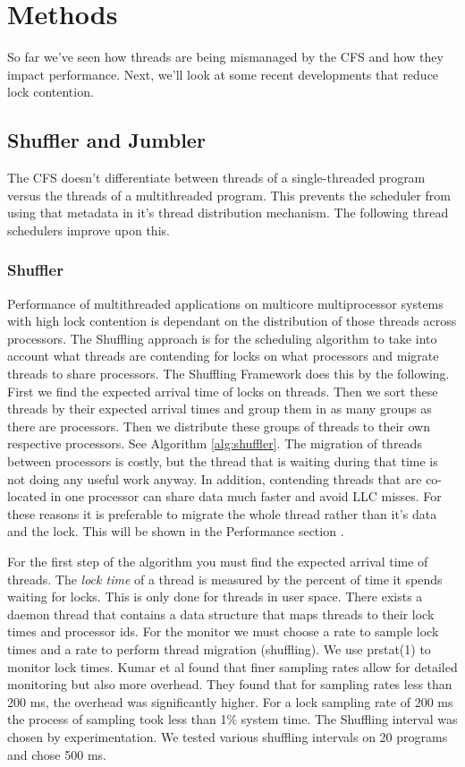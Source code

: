 \documentclass{sig-alternate}
\begin{document}
\section{Methods}
\label{sec:methods}

So far we've seen how threads are being mismanaged by the CFS and how they impact performance. Next, we'll look at some recent developments that reduce lock contention.

\subsection{Shuffler and Jumbler}
\label{sec:sj}

The CFS doesn't differentiate between threads of a single-threaded program versus the threads of a multithreaded program. This prevents the scheduler from using that metadata in it's thread distribution mechanism. The following thread schedulers improve upon this.

\subsubsection{Shuffler}
\label{sec:shuffler}

Performance of multithreaded applications on multicore multiprocessor systems with high lock contention is dependant on the distribution of those threads across processors. The Shuffling approach is for the scheduling algorithm to take into account what threads are contending for locks on what processors and migrate threads to share processors. The Shuffling Framework does this by the following. First we find the expected arrival time of locks on threads. Then we sort these threads by their expected arrival times and group them in as many groups as there are processors. Then we distribute these groups of threads to their own respective processors. See Algorithm \ref{alg:shuffler}. The migration of threads between processors is costly, but the thread that is waiting during that time is not doing any useful work anyway. In addition, contending threads that are co-located in one processor can share data much faster and avoid LLC misses. For these reasons it is preferable to migrate the whole thread rather than it's data and the lock. This will be shown in the Performance section \cite{KumarEtal:2014}.

For the first step of the algorithm you must find the expected arrival time of threads. The \textit{lock time} of a thread is measured by the percent of time it spends waiting for locks. This is only done for threads in user space. There exists a daemon thread that contains a data structure that maps threads to their lock times and processor ids. For the monitor we must choose a rate to sample lock times and a rate to perform thread migration (shuffling). We use prstat(1) to monitor lock times. Kumar et al found that finer sampling rates allow for detailed monitoring but also more overhead. They found that for sampling rates less than 200 ms, the overhead was significantly higher. For a lock sampling rate of 200 ms the process of sampling took less than 1\% system time. The Shuffling interval was chosen by experimentation. We tested various shuffling intervals on 20 programs and chose 500 ms.
\end{document}
